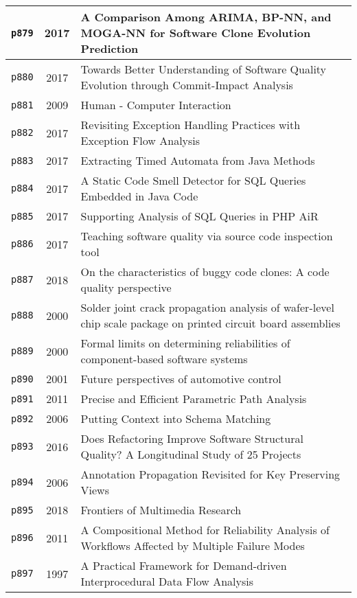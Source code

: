 \begin{longtable}{| c | c | p{16cm} |}
  \hline
  \texttt{p879} & 2017 & A Comparison Among ARIMA, BP-NN, and MOGA-NN for Software Clone Evolution Prediction \\
  \hline
  \texttt{p880} & 2017 & Towards Better Understanding of Software Quality Evolution through Commit-Impact Analysis \\
  \hline
  \texttt{p881} & 2009 & Human - Computer Interaction \\
  \hline
  \texttt{p882} & 2017 & Revisiting Exception Handling Practices with Exception Flow Analysis \\
  \hline
  \texttt{p883} & 2017 & Extracting Timed Automata from Java Methods \\
  \hline
  \texttt{p884} & 2017 & A Static Code Smell Detector for SQL Queries Embedded in Java Code \\
  \hline
  \texttt{p885} & 2017 & Supporting Analysis of SQL Queries in PHP AiR \\
  \hline
  \texttt{p886} & 2017 & Teaching software quality via source code inspection tool \\
  \hline
  \texttt{p887} & 2018 & On the characteristics of buggy code clones: A code quality perspective \\
  \hline
  \texttt{p888} & 2000 & Solder joint crack propagation analysis of wafer-level chip scale package on printed circuit board assemblies \\
  \hline
  \texttt{p889} & 2000 & Formal limits on determining reliabilities of component-based software systems \\
  \hline
  \texttt{p890} & 2001 & Future perspectives of automotive control \\
  \hline
  \texttt{p891} & 2011 & Precise and Efficient Parametric Path Analysis \\
  \hline
  \texttt{p892} & 2006 & Putting Context into Schema Matching \\
  \hline
  \texttt{p893} & 2016 & Does Refactoring Improve Software Structural Quality? A Longitudinal Study of 25 Projects \\
  \hline
  \texttt{p894} & 2006 & Annotation Propagation Revisited for Key Preserving Views \\
  \hline
  \texttt{p895} & 2018 & Frontiers of Multimedia Research \\
  \hline
  \texttt{p896} & 2011 & A Compositional Method for Reliability Analysis of Workflows Affected by Multiple Failure Modes \\
  \hline
  \texttt{p897} & 1997 & A Practical Framework for Demand-driven Interprocedural Data Flow Analysis \\

\end{longtable}
